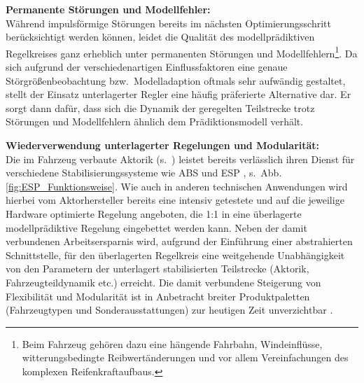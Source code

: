 \textbf{Permanente Störungen und Modellfehler:} \\
Während impulsförmige Störungen bereits im nächsten Optimierungsschritt berücksichtigt werden können, leidet die Qualität des modellprädiktiven Regelkreises ganz erheblich unter permanenten Störungen und Modellfehlern\footnote{Beim Fahrzeug gehören dazu eine hängende Fahrbahn, Windeinflüsse, witterungsbedingte Reibwertänderungen und vor allem Vereinfachungen des komplexen Reifenkraftaufbaus.}. Da sich aufgrund der verschiedenartigen Einflussfaktoren eine genaue Störgrößenbeobachtung \cite{lunze2012regelungstechnik} bzw.\ Modelladaption \cite{kok95} oftmals sehr aufwändig gestaltet, stellt der Einsatz unterlagerter Regler eine häufig präferierte Alternative dar. Er sorgt dann dafür, dass sich die Dynamik der geregelten Teilstrecke trotz Störungen und Modellfehlern ähnlich dem Prädiktionsmodell verhält.

\textbf{Wiederverwendung unterlagerter Regelungen und Modularität:} \\
Die im Fahrzeug verbaute Aktorik (s.\ ) leistet bereits verlässlich ihren Dienst für verschiedene Stabilisierungssysteme wie ABS und ESP \cite{kiencke2005automotive, isermann2006frm}, s.\ Abb.\,\ref{fig:ESP_Funktionsweise}. Wie auch in anderen technischen Anwendungen wird hierbei vom Aktorhersteller bereits eine intensiv getestete und auf die jeweilige Hardware optimierte Regelung angeboten, die 1:1 in eine überlagerte modellprädiktive Regelung eingebettet werden kann. Neben der damit verbundenen Arbeitsersparnis wird, aufgrund der Einführung einer abstrahierten Schnittstelle, für den überlagerten Regelkreis eine weitgehende Unabhängigkeit von den Parametern der unterlagert stabilisierten Teilstrecke (Aktorik, Fahrzeugteildynamik etc.) erreicht. Die damit verbundene Steigerung von Flexibilität und Modularität ist in Anbetracht breiter Produktpaletten (Fahrzeugtypen und Sonderausstattungen) zur heutigen Zeit unverzichtbar \cite{rathgeber_ecc2014}.




